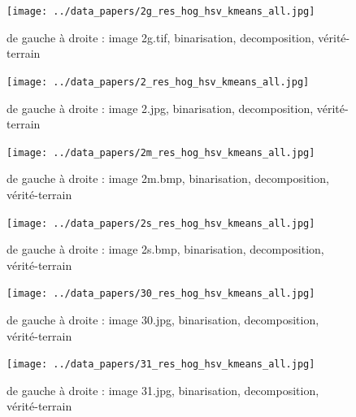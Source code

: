 \documentclass{book}
\begin{document}
\begin{figure}[H]
\begin{center}
\texttt{[image: ../data\_papers/2g\_res\_hog\_hsv\_kmeans\_all.jpg]}
\end{center}
\caption{de gauche à droite : image 2g.tif, binarisation, decomposition, vérité-terrain}
\label{2g}
\end{figure}
\clearpage


\begin{figure}[H]
\begin{center}
\texttt{[image: ../data\_papers/2\_res\_hog\_hsv\_kmeans\_all.jpg]}
\end{center}
\caption{de gauche à droite : image 2.jpg, binarisation, decomposition, vérité-terrain}
\label{2}
\end{figure}
\clearpage


\begin{figure}[H]
\begin{center}
\texttt{[image: ../data\_papers/2m\_res\_hog\_hsv\_kmeans\_all.jpg]}
\end{center}
\caption{de gauche à droite : image 2m.bmp, binarisation, decomposition, vérité-terrain}
\label{2m}
\end{figure}
\clearpage


\begin{figure}[H]
\begin{center}
\texttt{[image: ../data\_papers/2s\_res\_hog\_hsv\_kmeans\_all.jpg]}
\end{center}
\caption{de gauche à droite : image 2s.bmp, binarisation, decomposition, vérité-terrain}
\label{2s}
\end{figure}
\clearpage


\begin{figure}[H]
\begin{center}
\texttt{[image: ../data\_papers/30\_res\_hog\_hsv\_kmeans\_all.jpg]}
\end{center}
\caption{de gauche à droite : image 30.jpg, binarisation, decomposition, vérité-terrain}
\label{30}
\end{figure}
\clearpage


\begin{figure}[H]
\begin{center}
\texttt{[image: ../data\_papers/31\_res\_hog\_hsv\_kmeans\_all.jpg]}
\end{center}
\caption{de gauche à droite : image 31.jpg, binarisation, decomposition, vérité-terrain}
\label{31}
\end{figure}
\clearpage
\end{document}

